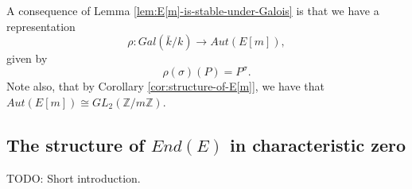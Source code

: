 A consequence of Lemma \ref{lem:E[m]-is-stable-under-Galois} is that we have a
representation
\begin{equation*}
\rho : Gal(\bar{k} / k) \rightarrow Aut(E[m]),
\end{equation*}
given by
\begin{equation}
  \label{eq:Galois-representation}
  \rho (\sigma) (P) = P^{\sigma}.
\end{equation}
Note also, that by Corollary \ref{cor:structure-of-E[m]}, we have that $Aut(E[m])
\cong GL_{2}(\mathbb{Z} / m \mathbb{Z})$.

\subsection{The structure of $End(E)$ in characteristic zero}
\label{sec:struct-ende-char-zero}

TODO: Short introduction.

